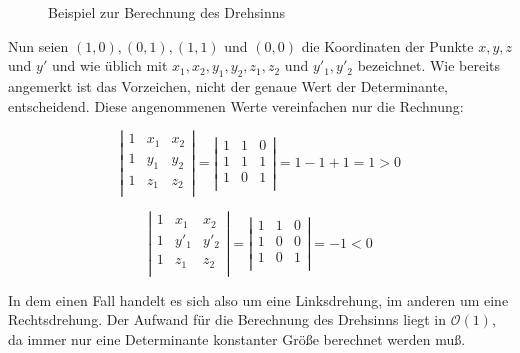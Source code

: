 \documentclass[ngerman,draft,parskip=half*,twoside]{scrreprt}
\theoremstyle{break}
\theoremstyle{nonumberbreak}
\newcommand*{\OO}{\mathcal{O}}      %
\begin{document}
\begin{figure}[H]
\centering

\caption{Beispiel zur Berechnung des Drehsinns}
\label{drehsinnskizze}
\end{figure}

Nun seien $(1,0), (0,1), (1,1)$ und $(0,0)$ die Koordinaten der Punkte $x,y,z$ und $y'$ 
und wie üblich mit $x_1, x_2, y_1, y_2, z_1, z_2$ und $y'_1, y'_2$
bezeichnet. Wie bereits angemerkt ist das Vorzeichen, nicht der genaue Wert der
Determinante, entscheidend. Diese angenommenen Werte vereinfachen nur die Rechnung:

\[ \left| 
\begin{array}{ccc}
1 & x_1 & x_2\\
1 & y_1 & y_2\\
1 & z_1 & z_2\\
\end{array} 
\right|=
\left| 
\begin{array}{ccc}
1 & 1 & 0\\
1 & 1 & 1\\
1 & 0 & 1\\
\end{array} 
\right|=1-1+1=1>0 \]

\[ \left| 
\begin{array}{ccc}
1 & x_1 & x_2\\
1 & y'_1 & y'_2\\
1 & z_1 & z_2\\
\end{array} 
\right|=
\left| 
\begin{array}{ccc}
1 & 1 & 0\\
1 & 0 & 0\\
1 & 0 & 1\\
\end{array} 
\right|=-1<0 \]

In dem einen Fall handelt es sich also um eine Linksdrehung, im anderen um eine Rechtsdrehung. Der Aufwand für die Berechnung des
Drehsinns liegt in $\OO(1)$, da immer nur eine Determinante konstanter Größe berechnet werden muß.
\end{document}
